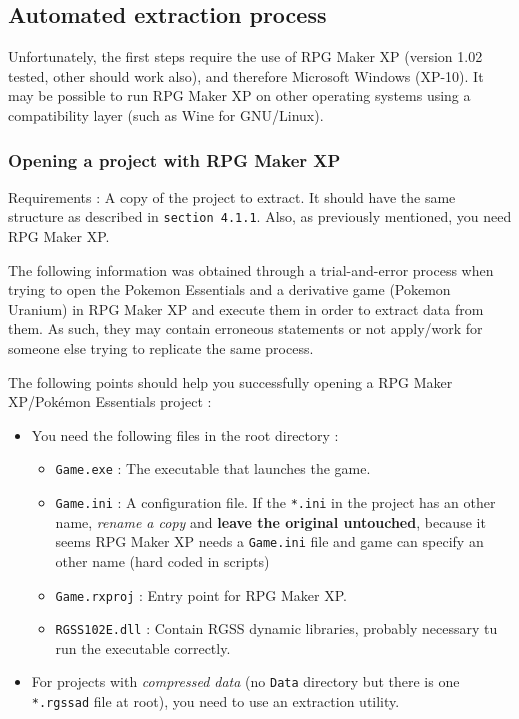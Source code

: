 \documentclass[11pt]{article}
\begin{document}
{\subsection{Automated extraction process}

Unfortunately, the first steps require the use of RPG Maker XP (version 1.02 tested, other should work also), and therefore Microsoft Windows (XP-10). It may be possible to run RPG Maker XP on other operating systems using a compatibility layer (such as Wine for GNU/Linux).


\subsubsection{Opening a project with RPG Maker XP}

Requirements : A copy of the project to extract. It should have the same structure as described in \verb|section 4.1.1|. Also, as previously mentioned, you need RPG Maker XP.

The following information was obtained through a trial-and-error process when trying to open the Pokemon Essentials and a derivative game (Pokemon Uranium) in RPG Maker XP and execute them in order to extract data from them. As such, they may contain erroneous statements or not apply/work for someone else trying to replicate the same process.

The following points should help you successfully opening a RPG Maker XP/Pokémon Essentials project :

\begin{itemize}
	\item You need the following files in the root directory :
	
	\begin{itemize}
		\item \verb|Game.exe| : The executable that launches the game.
		\item \verb|Game.ini| : A configuration file. If the \verb|*.ini| in the project has an other name, \textit{rename a copy} and \textbf{leave the original untouched}, because it seems RPG Maker XP needs a \verb|Game.ini| file and game can specify an other name (hard coded in scripts)
		\item \verb|Game.rxproj| : Entry point for RPG Maker XP.
		\item \verb|RGSS102E.dll| : Contain RGSS dynamic libraries, probably necessary tu run the executable correctly.
	\end{itemize}
	
	\item For projects with \textit{compressed data} (no \verb|Data| directory but there is one \verb|*.rgssad| file at root), you need to use an extraction utility.
	

\end{itemize}}
\end{document}
